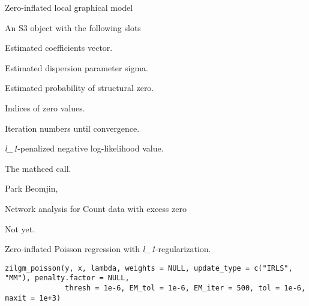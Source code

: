 \documentclass[a4paper]{book}
\begin{document}
%
\begin{Details}\relax
Zero-inflated local graphical model
\end{Details}
%
\begin{Value}
An S3 object with the following slots
\begin{ldescription}
\item[\code{beta}] Estimated coefficients vector.
\item[\code{sigma}] Estimated dispersion parameter sigma.
\item[\code{prob}] Estimated probability of structural zero.
\item[\code{pos\_zero}] Indices of zero values.
\item[\code{iteration}] Iteration numbers until convergence.
\item[\code{loglik}] \emph{l\_1}-penalized negative log-likelihood value.
\item[\code{call}] The mathced call.
\end{ldescription}
\end{Value}
%
\begin{Author}\relax
Park Beomjin, 
\end{Author}
%
\begin{References}\relax
Network analysis for Count data with excess zero
\end{References}
%
\begin{Examples}
\begin{ExampleCode}
Not yet.
\end{ExampleCode}
\end{Examples}
%
\begin{Description}\relax
Zero-inflated Poisson regression with \emph{l\_1}-regularization.
\end{Description}
%
\begin{Usage}
\begin{verbatim}
zilgm_poisson(y, x, lambda, weights = NULL, update_type = c("IRLS", "MM"), penalty.factor = NULL,
              thresh = 1e-6, EM_tol = 1e-6, EM_iter = 500, tol = 1e-6, maxit = 1e+3)
\end{verbatim}
\end{Usage}
%
\end{document}
